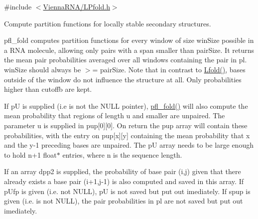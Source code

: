 {\ttfamily \#include $<$\mbox{\hyperlink{_l_pfold_8h}{Vienna\+R\+N\+A/\+L\+Pfold.\+h}}$>$}



Compute partition functions for locally stable secondary structures. 

pfl\+\_\+fold computes partition functions for every window of size \textquotesingle{}win\+Size\textquotesingle{} possible in a R\+NA molecule, allowing only pairs with a span smaller than \textquotesingle{}pair\+Size\textquotesingle{}. It returns the mean pair probabilities averaged over all windows containing the pair in \textquotesingle{}pl\textquotesingle{}. \textquotesingle{}win\+Size\textquotesingle{} should always be $>$= \textquotesingle{}pair\+Size\textquotesingle{}. Note that in contrast to \mbox{\hyperlink{group__local__mfe__fold_ga16e5a70e60835bb969eaecbe6482f1be}{Lfold()}}, bases outside of the window do not influence the structure at all. Only probabilities higher than \textquotesingle{}cutoffb\textquotesingle{} are kept.

If \textquotesingle{}pU\textquotesingle{} is supplied (i.\+e is not the N\+U\+LL pointer), \mbox{\hyperlink{group__local__pf__fold_ga7cdf690583871f9c158a0f91d4785cb6}{pfl\+\_\+fold()}} will also compute the mean probability that regions of length \textquotesingle{}u\textquotesingle{} and smaller are unpaired. The parameter \textquotesingle{}u\textquotesingle{} is supplied in \textquotesingle{}pup\mbox{[}0\mbox{]}\mbox{[}0\mbox{]}\textquotesingle{}. On return the \textquotesingle{}pup\textquotesingle{} array will contain these probabilities, with the entry on \textquotesingle{}pup\mbox{[}x\mbox{]}\mbox{[}y\mbox{]}\textquotesingle{} containing the mean probability that x and the y-\/1 preceding bases are unpaired. The \textquotesingle{}pU\textquotesingle{} array needs to be large enough to hold n+1 float$\ast$ entries, where n is the sequence length.

If an array dpp2 is supplied, the probability of base pair (i,j) given that there already exists a base pair (i+1,j-\/1) is also computed and saved in this array. If p\+Ufp is given (i.\+e. not N\+U\+LL), pU is not saved but put out imediately. If spup is given (i.\+e. is not N\+U\+LL), the pair probabilities in pl are not saved but put out imediately.


